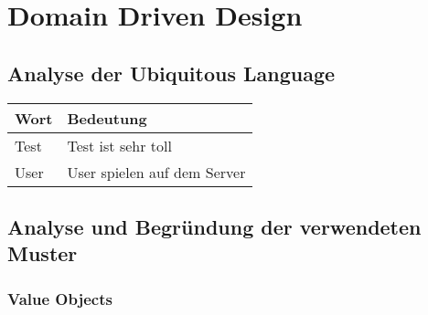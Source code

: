 \chapter{Domain Driven Design}
\section{Analyse der Ubiquitous Language}



\begin{center}
    \begin{tabular}{ | l | l | }
        \hline
        Wort & Bedeutung                   \\ \hline
        Test & Test ist sehr toll          \\ \hline
        User & User spielen auf dem Server \\
        \hline
    \end{tabular}
\end{center}


\section{Analyse und Begründung der verwendeten Muster}

\subsection{Value Objects}




